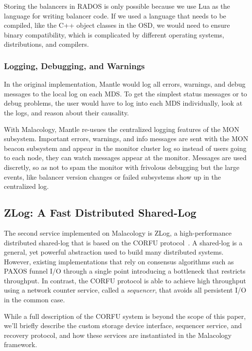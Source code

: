 \documentclass[preprint]{sigplanconf-eurosys}
\begin{document}
Storing the balancers in RADOS is only possible because we use Lua as the
language for writing balancer code. If we used a language that needs to be
compiled, like the C++ object classes in the OSD, we would need to ensure
binary compatibility, which is complicated by different operating systems,
distributions, and compilers.

\subsubsection{Logging, Debugging, and Warnings}

In the original implementation, Mantle would log all errors, warnings, and
debug messages to the local log on each MDS. To get the simplest status
messages or to debug problems, the user would have to log into each MDS
individually, look at the logs, and reason about their causality. 

With Malacology, Mantle re-usues the centralized logging features of the MON
subsystem. Important errors, warnings, and info messages are sent with the MON
beacon subsystem and appear in the monitor cluster log so instead of users
going to each node, they can watch messages appear at the monitor. Messages are
used discretly, so as not to spam the monitor with frivolous debugging but the
large events, like balancer version changes or failed subsystems show up in the
centralized log.

\subsection{ZLog: A Fast Distributed Shared-Log}
\label{sec:zlog}

The second service implemented on Malacology is ZLog, a high-performance
distributed shared-log that is based on the CORFU
protocol~\cite{balakrishnan_corfu_2012}. A
shared-log is a general, yet powerful abstraction used to build many
distributed systems. However, existing implementations that rely on consensus
algorithms such as PAXOS funnel I/O through a single point introducing a
bottleneck that restricts throughput. In contrast, the CORFU protocol is able
to achieve high throughput using a network counter service, called a 
\emph{sequencer}, that avoids all persistent I/O in the common case.

While a full description of the CORFU system is beyond the scope of this
paper, we'll briefly describe the custom storage device interface, sequencer
service, and recovery protocol, and how these services are instantiated in the
Malacology framework.
\end{document}
